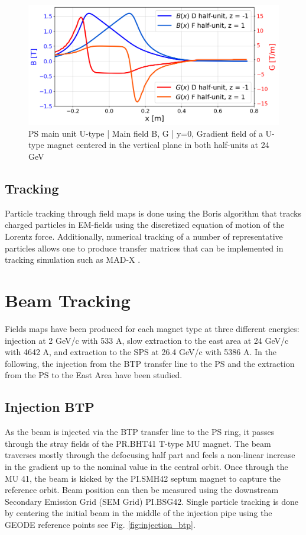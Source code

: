 \documentclass[a4paper,
               biblatex,     %
               keeplastbox,   %
               ]{jacow}
\begin{document}
\begin{figure}[!htb]
   \centering
   \includegraphics*[width=1.0\columnwidth, trim={0 0 0 0cm},clip]{Main_field_B_G.png}
   \caption{PS main unit U-type | Main field B, G | y=0, Gradient field of a U-type magnet centered in the vertical plane in both half-units at 24 GeV}
   \label{fig:gradient_field}
\end{figure}

\subsection{Tracking}
Particle tracking through field maps is done using the Boris algorithm that tracks charged particles in EM-fields using the discretized equation of motion of the Lorentz force\cite{qin_why_2013}\cite{ripperda_comprehensive_2018}. Additionally, numerical tracking of a number of representative particles allows one to produce transfer matrices that can be implemented in tracking simulation such as MAD-X \cite{yoon_method_2013}.

\section{Beam Tracking}
Fields maps have been produced for each magnet type at three different energies: injection at 2 GeV/c with 533 A, slow extraction to the east area at 24 GeV/c with 4642 A, and extraction to the SPS at 26.4 GeV/c with 5386 A. In the following, the injection from the BTP transfer line to the PS and the extraction from the PS to the East Area have been studied.

\subsection{Injection BTP}
As the beam is injected via the BTP transfer line to the PS ring, it passes through the stray fields of the PR.BHT41 T-type MU magnet. The beam traverses mostly through the defocusing half part and feels a non-linear increase in the gradient up to the nominal value in the central orbit. Once through the MU 41, the beam is kicked by the PI.SMH42 septum magnet to capture the reference orbit. Beam position can then be measured using the downstream Secondary Emission Grid (SEM Grid) PI.BSG42. Single particle tracking is done by centering the initial beam in the middle of the injection pipe using the GEODE reference points see Fig. \ref{fig:injection_btp}.
\end{document}
